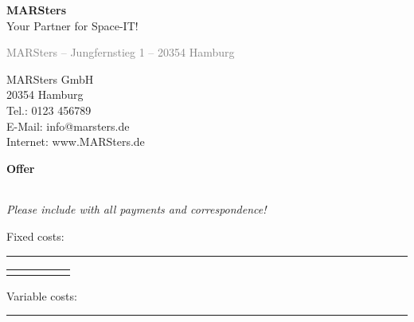 \documentclass[12pt,a4paper]{article}
\begin{document}
\noindent
\raggedleft
\Huge\textbf{MARSters} \\[0.3em]
\large Your Partner for Space-IT! \\
\vspace{2em}
\begin{minipage}[t]{0.5\textwidth}
{\small \textcolor{gray}{MARSters – Jungfernstieg 1 – 20354 Hamburg}} \\[1em]

\end{minipage}
\hfill
\begin{minipage}[t]{0.45\textwidth}
\raggedleft
\vspace{1em}
MARSters GmbH \\
20354 Hamburg \\
Tel.: 0123 456789 \\
E-Mail: info@marsters.de \\
Internet: www.MARSters.de
\end{minipage}

\vspace{1.8em}

\textbf{\LARGE Offer}

\vspace{1em}
\begin{tabularx}{\textwidth}{@{}l X r@{}}

\end{tabularx}

\small\textit{Please include with all payments and correspondence!}

\vspace{1em}
\begin{flushleft}
Fixed costs: \\
\rule{\textwidth}{0.5pt}
\end{flushleft}

\renewcommand{\arraystretch}{1.4}
\begin{tabularx}{\textwidth}{|l|X|r|r|r|}
\hline
\rowcolor{gray!30}


\end{tabularx}
\vspace{8.5em}

\vspace{1em}
\begin{flushleft}
Variable costs: \\
\rule{\textwidth}{0.5pt}
\end{flushleft}
\end{document}
